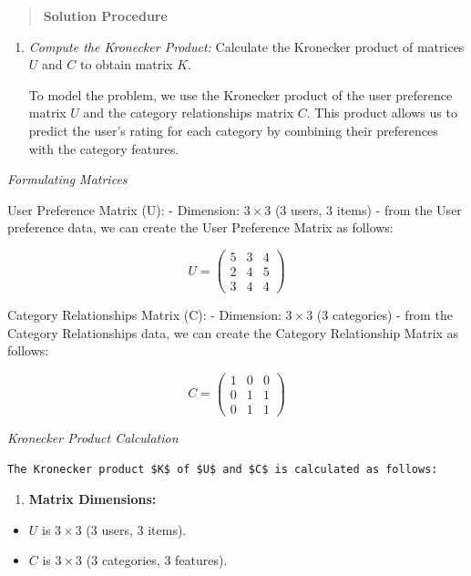 \documentclass[
  letterpaper,
  DIV=11,
  numbers=noendperiod]{scrreprt}
\providecommand{\tightlist}{%
  \setlength{\itemsep}{0pt}\setlength{\parskip}{0pt}}\usepackage{longtable,booktabs,array}
\theoremstyle{plain}
\theoremstyle{definition}
\theoremstyle{remark}
\begin{document}
\begin{tcolorbox}
\begin{tcolorbox}
\end{tcolorbox}

\begin{quote}
\textbf{Solution Procedure}
\end{quote}

\begin{enumerate}
\def\labelenumi{\arabic{enumi}.}
\item
  \emph{Compute the Kronecker Product:} Calculate the Kronecker product
  of matrices \(U\) and \(C\) to obtain matrix \(K\).

  To model the problem, we use the Kronecker product of the user
  preference matrix \(U\) and the category relationships matrix \(C\).
  This product allows us to predict the user's rating for each category
  by combining their preferences with the category features.
\end{enumerate}

\emph{Formulating Matrices}

User Preference Matrix (U): - Dimension: \(3\times 3\) (3 users, 3
items) - from the User preference data, we can create the User
Preference Matrix as follows:

\[U = \begin{pmatrix}5 & 3 & 4 \\2 & 4 & 5 \\3 & 4 & 4 \end{pmatrix}\]

Category Relationships Matrix (C): - Dimension: \(3 \times 3\) (3
categories) - from the Category Relationships data, we can create the
Category Relationship Matrix as follows:

\[C = \begin{pmatrix}1 & 0 & 0 \\ 0 & 1 & 1 \\ 0 & 1 & 1\end{pmatrix}\]

\emph{Kronecker Product Calculation}

\begin{verbatim}
The Kronecker product $K$ of $U$ and $C$ is calculated as follows:
\end{verbatim}

\begin{enumerate}
\def\labelenumi{\arabic{enumi}.}
\tightlist
\item
  \textbf{Matrix Dimensions:}
\end{enumerate}

\begin{itemize}
\tightlist
\item
  \(U\) is \(3 \times 3\) (3 users, 3 items).
\item
  \(C\) is \(3 \times 3\) (3 categories, 3 features).
\end{itemize}


\end{tcolorbox}
\end{document}
